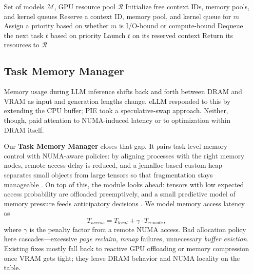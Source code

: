 \begin{algorithm}[t]
\caption{GPU Process Allocator Pseudocode}
\label{alg:gpa_en}
\begin{algorithmic}[1]
\Require Set of models $\mathcal{M}$, GPU resource pool $\mathcal{R}$
\State Initialize free context IDs, memory pools, and kernel queues
  \State Reserve a context ID, memory pool, and kernel queue for $m$
  \State Assign a priority based on whether $m$ is I/O-bound or compute-bound
\EndFor
{}
  \State Dequeue the next task $t$ based on priority
  \State Launch $t$ on its reserved context
    \State Return its resources to $\mathcal{R}$
  \EndIf
\EndWhile
\end{algorithmic}
\end{algorithm}


\subsection{Task Memory Manager}
Memory usage during LLM inference shifts back and forth between DRAM and VRAM as input and generation lengths change. eLLM \cite{xu2025ellm} responded to this by extending the CPU buffer; PIE \cite{xu2024pie} took a speculative-swap approach. Neither, though, paid attention to NUMA-induced latency or to optimization within DRAM itself.

Our \textbf{Task Memory Manager} closes that gap. It pairs task-level memory control with NUMA-aware policies: by aligning processes with the right memory nodes, remote-access delay is reduced, and a jemalloc-based custom heap separates small objects from large tensors so that fragmentation stays manageable \cite{hunter2021hugepage,yang2023numalloc}. On top of this, the module looks ahead: tensors with low expected access probability are offloaded preemptively, and a small predictive model of memory pressure feeds anticipatory decisions \cite{korthikanti2023reducing}.
We model memory access latency as
\[
T_{access} = T_{local} + \gamma \cdot T_{remote},
\]
where $\gamma$ is the penalty factor from a remote NUMA access.
Bad allocation policy here cascades---excessive \textit{page reclaim}, \textit{mmap} failures, unnecessary \textit{buffer eviction}. Existing fixes mostly fall back to reactive GPU offloading or memory compression once VRAM gets tight; they leave DRAM behavior and NUMA locality on the table.


